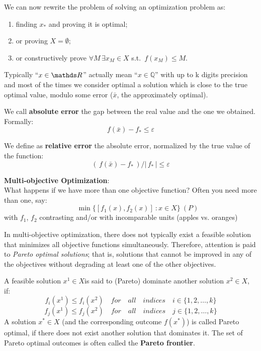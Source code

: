 \documentclass[ComputationalMathematics.tex]{subfiles}
\begin{document}
\noindent We can now rewrite the problem of solving an optimization problem as:
\begin{enumerate}
  \item finding $x_*$ and proving it is optimal;
  \item or proving $X = \emptyset$;
  \item or constructively prove $\forall M \, \exists x_M \in X$ s.t.~$f(x_M) \leq M$.
\end{enumerate}

Typically “$x \in \R$” actually mean “$x \in \mathbb{Q}$” with up to k digits precision and most of the times we consider optimal a solution which is close to the true optimal value, modulo some error ($\bar{x}$, the approximately optimal).

\begin{definition}
  We call \textbf{absolute error} the gap between the real value and the one we obtained. Formally:
\[
  f(\bar{x}) - f_* \leq \varepsilon
\]
\end{definition}

\begin{definition}
  We define as \textbf{relative error} the absolute error, normalized by the true value of the function:
\[
  ( \, f(\bar{x}) - f_* \, ) / | \, f_* \, | \leq \varepsilon
\]
\end{definition}

\noindent \textbf{Multi-objective Optimization}:\\
What happens if we have more than one objective function?\newline
Often you need more than one, say:
\[
  \qquad \min \{[f_1(x),f_2(x)]~:x \in X\}~(P)
\]
with $f_1$, $f_2$ contrasting and/or with incomparable units (apples vs. oranges)

In multi-objective optimization, there does not typically exist a feasible solution that minimizes all objective functions simultaneously. Therefore, attention is paid to \emph{Pareto optimal solutions}; that is, solutions that cannot be improved in any of the objectives without degrading at least one of the other objectives.
\begin{definition}
   A feasible solution $x^{1} \in X$is said to (Pareto) dominate another solution $x^{2} \in X$, if:
  \[
  f_{i}(x^{1})\leq f_{i}(x^{2})\quad for\quad all\quad indices\quad i \in \{ 1,2,\dots ,k\}
\]
\[
  f_{j}(x^{1})\leq f_{j}(x^{2})\quad for\quad all\quad indices\quad j \in \{ 1,2,\dots ,k\}
\]
A solution $x^{*}\in X$ (and the corresponding outcome $f(x^{*})$) is called Pareto optimal, if there does not exist another solution that dominates it. The set of Pareto optimal outcomes is often called the \textbf{Pareto frontier}.
\end{definition}
\end{document}
